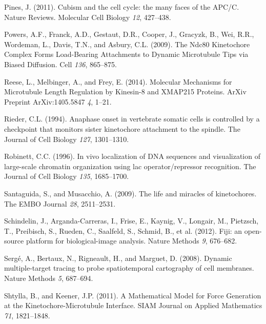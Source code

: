 \documentclass[12pt,a4paper,twoside,openright]{book}
\begin{document}
Pines, J. (2011). Cubism and the cell cycle: the many faces of the
APC/C. Nature Reviews. Molecular Cell Biology \emph{12}, 427--438.

Powers, A.F., Franck, A.D., Gestaut, D.R., Cooper, J., Gracyzk, B., Wei,
R.R., Wordeman, L., Davis, T.N., and Asbury, C.L. (2009). The Ndc80
Kinetochore Complex Forms Load-Bearing Attachments to Dynamic
Microtubule Tips via Biased Diffusion. Cell \emph{136}, 865--875.

Reese, L., Melbinger, A., and Frey, E. (2014). Molecular Mechanisms for
Microtubule Length Regulation by Kinesin-8 and XMAP215 Proteins. ArXiv
Preprint ArXiv:1405.5847 \emph{4}, 1--21.

Rieder, C.L. (1994). Anaphase onset in vertebrate somatic cells is
controlled by a checkpoint that monitors sister kinetochore attachment
to the spindle. The Journal of Cell Biology \emph{127}, 1301--1310.

Robinett, C.C. (1996). In vivo localization of DNA sequences and
visualization of large-scale chromatin organization using lac
operator/repressor recognition. The Journal of Cell Biology \emph{135},
1685--1700.

Santaguida, S., and Musacchio, A. (2009). The life and miracles of
kinetochores. The EMBO Journal \emph{28}, 2511--2531.

Schindelin, J., Arganda-Carreras, I., Frise, E., Kaynig, V., Longair,
M., Pietzsch, T., Preibisch, S., Rueden, C., Saalfeld, S., Schmid, B.,
et al. (2012). Fiji: an open-source platform for biological-image
analysis. Nature Methods \emph{9}, 676--682.

Sergé, A., Bertaux, N., Rigneault, H., and Marguet, D. (2008). Dynamic
multiple-target tracing to probe spatiotemporal cartography of cell
membranes. Nature Methods \emph{5}, 687--694.

Shtylla, B., and Keener, J.P. (2011). A Mathematical Model for Force
Generation at the Kinetochore-Microtubule Interface. SIAM Journal on
Applied Mathematics \emph{71}, 1821--1848.
\end{document}
